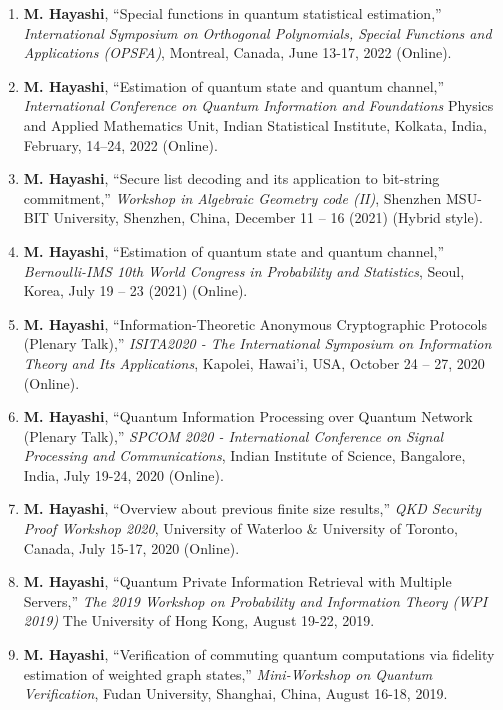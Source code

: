 \documentclass[a4paper,12pt,oneside]{article}
\begin{document}
\begin{enumerate}
\item 
\textbf{M. Hayashi}, 
``Special functions in quantum statistical estimation,'' 
{\em  International Symposium on Orthogonal Polynomials, Special Functions and Applications (OPSFA)}, 
Montreal, Canada, June 13-17, 2022 (Online).

\item 
\textbf{M. Hayashi}, 
``Estimation of quantum state and quantum channel,'' 
{\em  International Conference on Quantum Information and Foundations} Physics and Applied Mathematics Unit, 
Indian Statistical Institute, Kolkata, India, February, 14–24, 2022 (Online).

\item 
\textbf{M. Hayashi}, 
``Secure list decoding and its application to bit-string commitment,'' 
{\em  Workshop in Algebraic Geometry code (II)}, 
Shenzhen MSU-BIT University, Shenzhen, China, December 11 – 16 (2021) (Hybrid style).

\item 
\textbf{M. Hayashi}, 
``Estimation of quantum state and quantum channel,'' 
{\em  Bernoulli-IMS 10th World Congress in Probability and Statistics}, 
Seoul, Korea, July 19 – 23 (2021) (Online).

\item 
\textbf{M. Hayashi}, 
``Information-Theoretic Anonymous Cryptographic Protocols (Plenary Talk),'' 
{\em  ISITA2020 - The International Symposium on Information Theory and Its Applications}, 
Kapolei, Hawai’i, USA, October 24 -- 27, 2020 (Online). 

\item 
\textbf{M. Hayashi}, 
``Quantum Information Processing over Quantum Network (Plenary Talk),'' 
{\em  SPCOM 2020 - International Conference on Signal Processing and Communications}, 
Indian Institute of Science, Bangalore, India, July 19-24, 2020 (Online). 

\item 
\textbf{M. Hayashi}, 
``Overview about previous finite size results,''
{\em  QKD Security Proof Workshop 2020}, 
University of Waterloo \& University of Toronto,
Canada, July 15-17, 2020 (Online). 

\item 
\textbf{M. Hayashi}, 
``Quantum Private Information Retrieval with Multiple Servers,''
{\em  The 2019 Workshop on Probability and Information Theory (WPI 2019)}
The University of Hong Kong, 
August 19-22, 2019. 

\item 
\textbf{M. Hayashi}, 
``Verification of commuting quantum computations via fidelity estimation of weighted graph states,''
{\em Mini-Workshop on Quantum Verification}, 
Fudan University, Shanghai, China,
August 16-18, 2019.


\end{enumerate}
\end{document}
